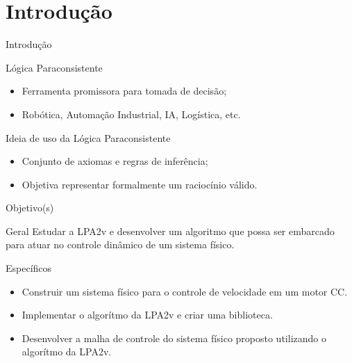 \section{Introdução}
\begin{frame}{Introdução}


\begin{block}{Lógica Paraconsistente \tiny \cite{JoaoInacio}}
\begin{itemize}
\item Ferramenta promissora para tomada de decisão;
\item Robótica, Automação Industrial, IA, Logística, etc.
\end{itemize}
\end{block}

\begin{alertblock}{Ideia de uso da Lógica Paraconsistente \tiny \cite{JISF2011}}
\begin{itemize}
\item Conjunto de axiomas e regras de inferência;
\item Objetiva representar formalmente um raciocínio válido.
\end{itemize}
\end{alertblock}



\end{frame}


\begin{frame}{Objetivo(s)}
\begin{exampleblock}{Geral}
Estudar a LPA2v e desenvolver um algoritmo que possa ser embarcado para atuar no controle dinâmico de um sistema físico.
\end{exampleblock}

\begin{alertblock}{Específicos}
\begin{itemize}
\item Construir um sistema físico para o controle de velocidade em um motor CC.
\item Implementar o algorítmo da LPA2v e criar uma biblioteca.
\item Desenvolver a malha de controle do sistema físico proposto utilizando o algorítmo da LPA2v.
\end{itemize}
\end{alertblock}

\end{frame}



